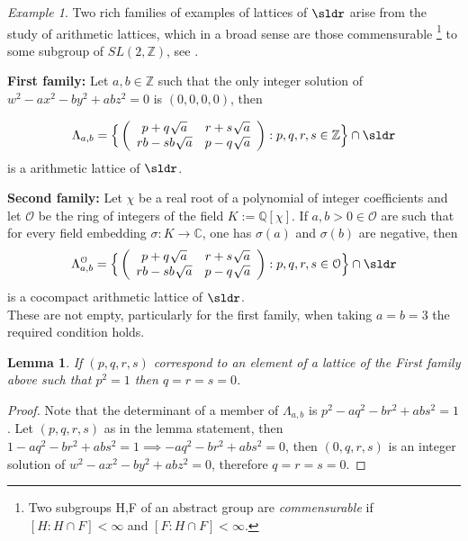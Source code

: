 \documentclass[11pt]{amsart}
\theoremstyle{plain}
\newtheorem{lem}[thm]{Lemma}
\theoremstyle{definition}
\theoremstyle{remark}
\newtheorem{exa}[thm]{Example}
\begin{document}
\begin{exa} Two rich families of examples of  lattices of $\sldr$ arise from the study of arithmetic lattices, which in a broad sense are those commensurable \footnote{Two subgroups H,F of an abstract group are \textit{commensurable} if $[H:H \cap F] < \infty$ and $[F:H \cap F] < \infty$.} to some subgroup of $SL(2,\mathbb{Z})$, see \cite{DM}.\end{exa}

\textbf{First family:} \cite{DM} Let $a,b \in \mathbb{Z}$ such that the only integer solution of \\
$w^2-ax^2-by^2+abz^2=0$ is $(0,0,0,0)$, then

\[ \Lambda_{a,b}= \Big\{ \left( \begin{array}{ccc}
p+q \,\, \sqrt[]{a} & r+s \,\, \sqrt[]{a} \\
rb-sb \,\, \sqrt[]{a} & p-q \,\, \sqrt[]{a} \end{array} \right):p,q,r,s \in \mathbb{Z} \Big\}  \cap \sldr \] 
is a arithmetic lattice of $\sldr$.	


\textbf{Second family:} \cite{DM} Let $\chi$ be a real root of a polynomial of integer coefficients and let $\mathcal{O}$ be the ring of integers of the field $K:=\mathbb{Q}[\chi]$. If $a,b > 0 \in \mathcal{O}$ are such that for every field embedding $\sigma : K \rightarrow \mathbb{C}$, one has $\sigma(a)$ and $\sigma(b)$ are negative, then
\[ \Lambda^{\mathcal{O}}_{a,b}= \Big\{ \left( \begin{array}{ccc}
p+q \,\, \sqrt[]{a} & r+s \,\, \sqrt[]{a} \\
rb-sb \,\, \sqrt[]{a} & p-q \,\, \sqrt[]{a} \end{array} \right):p,q,r,s \in \mathcal{O} \Big\}  \cap \sldr \] 
is a cocompact arithmetic lattice of $\sldr$.\\

These are not empty, particularly for the first family, when taking $a=b=3$ the required condition holds.\\

\begin{lem}\label{pcuadrado}
If $(p,q,r,s)$ correspond to an element of a lattice of the First family above such that $p^2=1$ then $q=r=s=0$.
\end{lem}

\begin{proof}
Note that the determinant of a member of $\Lambda_{a,b}$ is $p^2-aq^2-br^2+abs^2=1$. Let $(p,q,r,s)$ as in the lemma statement, then $1-aq^2-br^2+abs^2=1 \implies -aq^2-br^2+abs^2=0$, then  $(0,q,r,s)$ is an integer solution of $w^2-ax^2-by^2+abz^2=0$, therefore $q=r=s=0$.
\end{proof}
\end{document}
